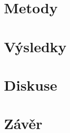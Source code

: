 \documentclass[a4paper,12pt,czech,oneside]{memoir}
\numberwithin{equation}{chapter}
\begin{document}
\chapter{Metody}

\clearpage

\chapter{Výsledky}

\clearpage

\chapter{Diskuse}

\clearpage

\chapter{Závěr}

\clearpage

\setlength\beforechapskip{-\baselineskip}

\printbibliography
\clearpage


\begin{appendices}
	
\end{appendices}
\end{document}

